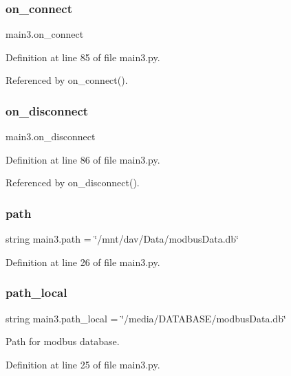 \subsubsection{on\+\_\+connect}
{\footnotesize\ttfamily main3.\+on\+\_\+connect}



Definition at line 85 of file main3.\+py.



Referenced by on\+\_\+connect().

\mbox{\label{namespacemain3_afecee61e71845eda2bab29e6c6d4f91c}} 
\subsubsection{on\+\_\+disconnect}
{\footnotesize\ttfamily main3.\+on\+\_\+disconnect}



Definition at line 86 of file main3.\+py.



Referenced by on\+\_\+disconnect().

\mbox{\label{namespacemain3_a94593883ff80bece1776244df08104a1}} 
\subsubsection{path}
{\footnotesize\ttfamily string main3.\+path = \char`\"{}/mnt/dav/Data/modbus\+Data.\+db\char`\"{}}



Definition at line 26 of file main3.\+py.

\mbox{\label{namespacemain3_a8e2441fb4fc06f2788b1864358403339}} 
\subsubsection{path\+\_\+local}
{\footnotesize\ttfamily string main3.\+path\+\_\+local = \char`\"{}/media/D\+A\+T\+A\+B\+A\+SE/modbus\+Data.\+db\char`\"{}}



Path for modbus database. 



Definition at line 25 of file main3.\+py.

\mbox{\label{namespacemain3_ab90723267d7b609bc02469c11db32a64}} 
